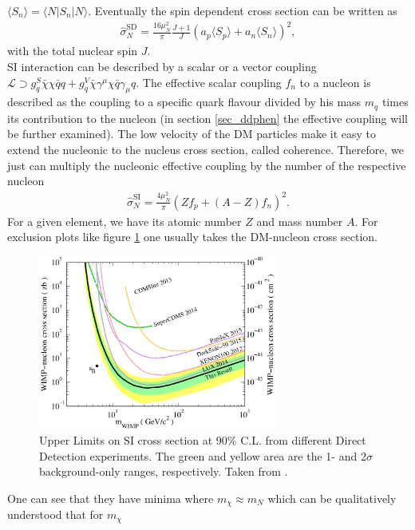 $\langle S_n\rangle = \langle N|S_n|N\rangle$. Eventually the spin dependent cross section can be written as
\begin{align}
 \hat\sigma_N^\text{SD} = \frac{16\mu_N^2}{\pi} \frac{J+1}{J}\left(a_p \langle S_p\rangle + a_n \langle S_n \rangle\right)^2,
 \label{eq_SDsigma}
\end{align}
with the total nuclear spin $J$.\\
\noindent SI interaction can be described by a scalar or a vector coupling 
$\mathcal{L} \supset g_q^S \bar \chi \chi \bar q q + g_q^V \bar \chi \gamma^\mu \chi \bar q \gamma_\mu q$. The effective scalar coupling $f_n$
to a nucleon is described as the coupling to a specific quark flavour divided by his mass $m_q$ times its contribution to the nucleon (in section
\ref{sec_ddphen} the effective coupling will be further examined). The low velocity of the DM particles make it easy to extend the nucleonic to the 
nucleus cross section, called coherence.  Therefore,
we just can multiply the nucleonic effective coupling by the number of the respective nucleon
\begin{align}
 \hat\sigma_N^\text{SI} = \frac{4\mu_N^2}{\pi} \left(Z f_p + (A-Z) f_n\right)^2.
 \label{eq_th.sigma.dd}
\end{align}
For a given element, we have its atomic number $Z$ and mass number $A$. For exclusion plots like figure \ref{pic_ddbounds} one usually takes the 
DM-nucleon cross section. 
\begin{figure}[t]
 \includegraphics[width=0.7\textwidth]{../pics/ddLux.jpeg}
 \caption{Upper Limits on SI cross section at 90\% C.L. from different Direct Detection experiments. The green and yellow area are the 1- and 2$\sigma$
 background-only ranges, respectively. Taken from \cite{1512.03506}.}
 \label{pic_ddbounds}
\end{figure}
One can see that they have minima where $m_\chi\approx m_N$ which can be qualitatively understood that for $m_\chi$ 

